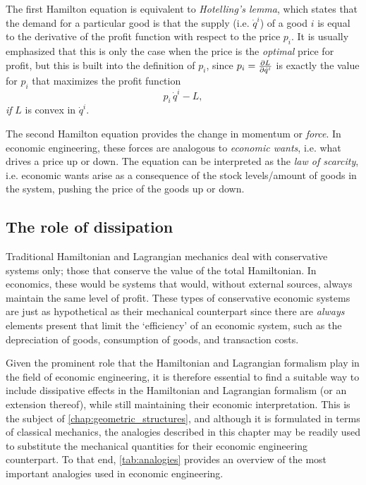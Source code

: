 The first Hamilton equation is equivalent to \emph{Hotelling's lemma}, which states that the demand for a particular good is that the supply (i.e. \(\dot{q}^i\)) of a good \(i\) is equal to the derivative of the profit function with respect to the price \(p_i\). It is usually emphasized that this is only the case when the price is the \emph{optimal} price for profit, but this is built into the definition of \(p_i\), since \(p_i = \pdv{L}{\dot{q}^i}\) is exactly the value for \(p_i\) that maximizes the profit function
\begin{equation}
     p_i\,\dot{q}^i - L,
\end{equation}
\emph{if} \(L\) is convex in \(\dot{q}^i\).

The second Hamilton equation provides the change in momentum or \emph{force}. In economic engineering, these forces are analogous to \emph{economic wants}, i.e. what drives a price up or down. The equation can be interpreted as the \emph{law of scarcity}, i.e. economic wants arise as a consequence of the stock levels/amount of goods in the system, pushing the price of the goods up or down.

\subsection{The role of dissipation} 
Traditional Hamiltonian and Lagrangian mechanics deal with conservative systems only; those that conserve the value of the total Hamiltonian. In economics, these would be systems that would, without external sources, always maintain the same level of profit. These types of conservative economic systems are just as hypothetical as their mechanical counterpart since there are \emph{always} elements present that limit the `efficiency' of an economic system, such as the depreciation of goods, consumption of goods, and transaction costs. 

Given the prominent role that the Hamiltonian and Lagrangian formalism play in the field of economic engineering, it is therefore essential to find a suitable way to include dissipative effects in the Hamiltonian and Lagrangian formalism (or an extension thereof), while still maintaining their economic interpretation. This is the subject of \cref{chap:geometric_structures}, and although it is formulated in terms of classical mechanics, the analogies described in this chapter may be readily used to substitute the mechanical quantities for their economic engineering counterpart. To that end, \cref{tab:analogies} provides an overview of the most important analogies used in economic engineering.

